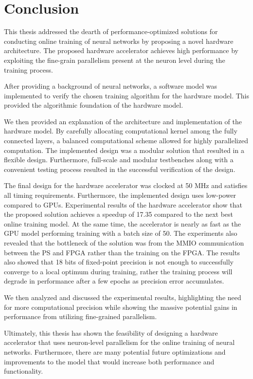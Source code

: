 \chapter{Conclusion}\label{conclusion}
This thesis addressed the dearth of performance-optimized solutions for conducting online training of neural networks by proposing a novel hardware architecture. The proposed hardware accelerator achieves high performance by exploiting the fine-grain parallelism present at the neuron level during the training process.

After providing a background of neural networks, a software model was implemented to verify the chosen training algorithm for the hardware model. This provided the algorithmic foundation of the hardware model.

We then provided an explanation of the architecture and implementation of the hardware model. By carefully allocating computational kernel among the fully connected layers, a balanced computational scheme allowed for highly parallelized computation. The implemented design was a modular solution that resulted in a flexible design. Furthermore, full-scale and modular testbenches along with a convenient testing process resulted in the successful verification of the design.

The final design for the hardware accelerator was clocked at 50 MHz and satisfies all timing requirements. Furthermore, the implemented design uses low-power compared to GPUs. Experimental results of the hardware accelerator show that the proposed solution achieves a speedup of 17.35 compared to the next best online training model. At the same time, the accelerator is nearly as fast as the GPU model performing training with a batch size of 50. The experiments also revealed that the bottleneck of the solution was from the MMIO communication between the PS and FPGA rather than the training on the FPGA. The results also showed that 18 bits of fixed-point precision is not enough to  successfully converge to a local optimum during training, rather the training process will degrade in performance after a few epochs as precision error accumulates. 

We then analyzed and discussed the experimental results, highlighting the need for more computational precision while showing the massive potential gains in performance from utilizing fine-grained parallelism. 

Ultimately, this thesis has shown the feasibility of designing a hardware accelerator that uses neuron-level parallelism for the online training of neural networks. Furthermore, there are many potential future optimizations and improvements to the model that would increase both performance and functionality.